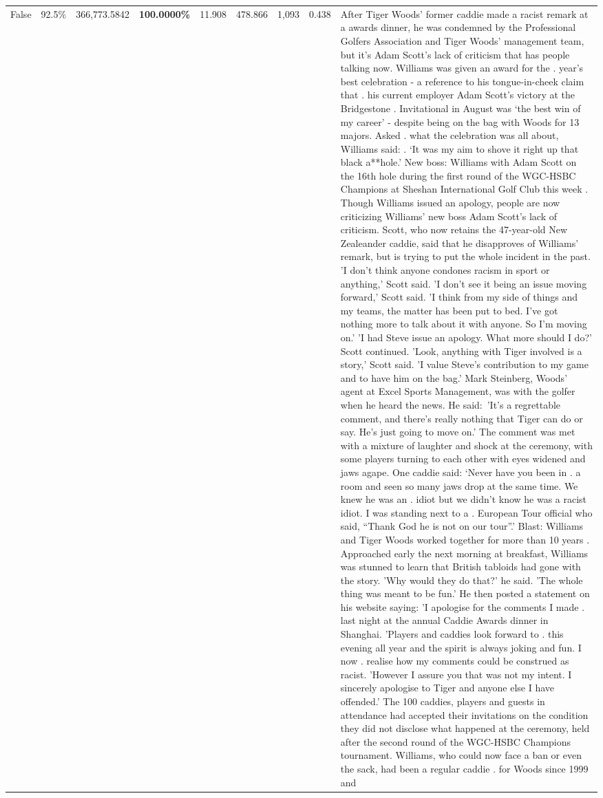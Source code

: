 \begin{table}[H]
\begin{tabular}{lllrlllll}
False & 92.5\% & 366,773.5842 & \bfseries \color{red} 100.0000\% & 11.908 & 478.866 & 1,093 & 0.438 & After Tiger Woods' former caddie made a racist remark at a awards dinner, he was condemned by the Professional Golfers Association and Tiger Woods' management team, but it's Adam Scott's lack of criticism that has people talking now. Williams was given an award for the . year’s best celebration - a reference to his tongue-in-cheek claim that . his current employer Adam Scott’s victory at the Bridgestone . Invitational in August was ‘the best win of my career’ - despite being on the bag with Woods for 13 majors. Asked . what the celebration was all about, Williams said: . ‘It was my aim to shove it right up that black a**hole.’ New boss: Williams with Adam Scott  on the 16th hole during the first round of the WGC-HSBC Champions at Sheshan International Golf Club this week . Though Williams issued an apology, people are now criticizing Williams' new boss Adam Scott's lack of criticism. Scott, who now retains the 47-year-old New Zealeander caddie, said that he disapproves of Williams' remark, but is trying to put the whole incident in the past. 'I don't think anyone condones racism in sport or anything,' Scott said. 'I don't see it being an issue moving forward,' Scott said. 'I think from my side of things and my teams, the matter has been put to bed. I've got nothing more to talk about it with anyone. So I'm moving on.' 'I had Steve issue an apology. What more should I do?' Scott continued. 'Look, anything with Tiger involved is a story,' Scott said. 'I value Steve's contribution to my game and to have him on the bag.' Mark Steinberg, Woods' agent at Excel Sports Management, was with the golfer when he heard the news. He said: 'It's a regrettable comment, and there's really nothing that Tiger can do or say. He's just going to move on.' The comment was met with a mixture of laughter and shock at the ceremony, with some players turning to each other with eyes widened and jaws agape. One caddie said: ‘Never have you been in . a room and seen so many jaws drop at the same time. We knew he was an . idiot but we didn’t know he was a racist idiot. I was standing next to a . European Tour official who said, “Thank God he is not on our tour”.’ Blast: Williams and Tiger Woods worked together for more than 10 years . Approached early the next morning at breakfast, Williams was stunned to learn that British tabloids had gone with the story. 'Why would they do that?' he said. 'The whole thing was meant to be fun.' He then posted a statement on his website saying: 'I apologise for the comments I made . last night at the annual Caddie Awards dinner in Shanghai. 'Players and caddies look forward to . this evening all year and the spirit is always joking and fun. I now . realise how my comments could be construed as racist. 'However I assure you that was not my intent. I sincerely apologise to Tiger and anyone else I have offended.' The 100 caddies, players and guests in attendance had accepted their invitations on the condition they did not disclose what happened at the ceremony, held after the second round of the WGC-HSBC Champions tournament. Williams, who could now face a ban or even the sack, had been a regular caddie . for Woods since 1999 and 
\end{tabular}
\end{table}
